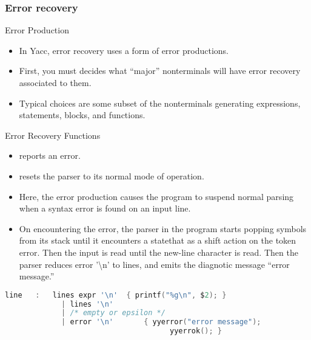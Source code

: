 \begin{bibunit}[apalike]
\subsubsection{Error recovery}

\tableofcontentslide[sectionstyle={show/shaded},subsectionstyle={show/shaded/hide},subsubsectionstyle={show/shaded/hide/hide}]

\begin{frame}{Error Production}
	\begin{itemize}
	\item In Yacc, error recovery uses a form of error productions.
	\item First, you must decides what ``major'' nonterminals will have error recovery associated to them.
	\item Typical choices are some subset of the nonterminals generating expressions, statements, blocks, and functions.
	\end{itemize}
\end{frame}

\begin{frame}[fragile]{Error Recovery Functions}
	\begin{itemize}
	\item {} reports an error.
	\item {} resets the parser to its normal mode of operation.
	\vfill
	\item \small Here, the error production causes the program to suspend normal parsing when a syntax error is found on an input line.
	\item \small On encountering the error, the parser in the program starts popping symbols from its stack until it encounters a statethat as a shift action on the token error. Then the input is read until the new-line character is read. Then the parser reduces error '{\textbackslash}n' to lines, and emits the diagnotic message ``error message.''
	\end{itemize}
	\begin{lstlisting}[language=C]
	line   :   lines expr '\n'  { printf("%g\n", $2); }
	         | lines '\n'
	         | /* empty or epsilon */
	         | error '\n'       { yyerror("error message");
                                      yyerrok(); }
	\end{lstlisting}
\end{frame}


\end{bibunit}
